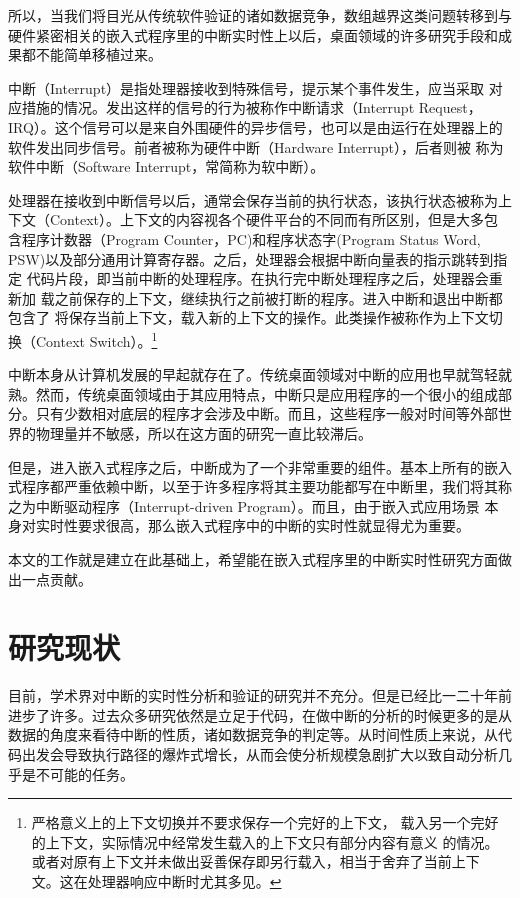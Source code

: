 所以，当我们将目光从传统软件验证的诸如数据竞争，数组越界这类问题转移到与
硬件紧密相关的嵌入式程序里的中断实时性上以后，桌面领域的许多研究手段和成
果都不能简单移植过来。

中断（Interrupt）是指处理器接收到特殊信号，提示某个事件发生，应当采取
对应措施的情况。发出这样的信号的行为被称作中断请求（Interrupt Request，
IRQ）。这个信号可以是来自外围硬件的异步信号，也可以是由运行在处理器上的
软件发出同步信号。前者被称为硬件中断（Hardware Interrupt），后者则被
称为软件中断（Software Interrupt，常简称为软中断）。

处理器在接收到中断信号以后，通常会保存当前的执行状态，该执行状态被称为上
下文（Context）。上下文的内容视各个硬件平台的不同而有所区别，但是大多包
含程序计数器（Program Counter，PC)和程序状态字(Program Status Word, 
PSW)以及部分通用计算寄存器。之后，处理器会根据中断向量表的指示跳转到指定
代码片段，即当前中断的处理程序。在执行完中断处理程序之后，处理器会重新加
载之前保存的上下文，继续执行之前被打断的程序。进入中断和退出中断都包含了
将保存当前上下文，载入新的上下文的操作。此类操作被称作为上下文切换（Context 
Switch）。\footnote{严格意义上的上下文切换并不要求保存一个完好的上下文，
载入另一个完好的上下文，实际情况中经常发生载入的上下文只有部分内容有意义
的情况。或者对原有上下文并未做出妥善保存即另行载入，相当于舍弃了当前上下
文。这在处理器响应中断时尤其多见。}

中断本身从计算机发展的早起就存在了。传统桌面领域对中断的应用也早就驾轻就
熟。然而，传统桌面领域由于其应用特点，中断只是应用程序的一个很小的组成部
分。只有少数相对底层的程序才会涉及中断。而且，这些程序一般对时间等外部世
界的物理量并不敏感，所以在这方面的研究一直比较滞后。

但是，进入嵌入式程序之后，中断成为了一个非常重要的组件。基本上所有的嵌入
式程序都严重依赖中断，以至于许多程序将其主要功能都写在中断里，我们将其称
之为中断驱动程序（Interrupt-driven Program）。而且，由于嵌入式应用场景
本身对实时性要求很高，那么嵌入式程序中的中断的实时性就显得尤为重要。

本文的工作就是建立在此基础上，希望能在嵌入式程序里的中断实时性研究方面做
出一点贡献。

\section{研究现状}
\label{sec:study}

目前，学术界对中断的实时性分析和验证的研究并不充分。但是已经比一二十年前
进步了许多。过去众多研究依然是立足于代码，在做中断的分析的时候更多的是从
数据的角度来看待中断的性质，诸如数据竞争的判定等。从时间性质上来说，从代
码出发会导致执行路径的爆炸式增长，从而会使分析规模急剧扩大以致自动分析几
乎是不可能的任务。

